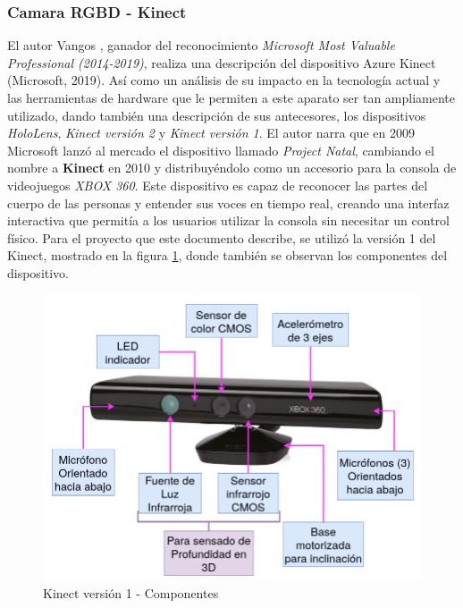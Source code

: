             \subsubsection{Camara RGBD - Kinect}

            El autor Vangos \cite{pterneas_mastering_2022}, ganador del reconocimiento \textit{Microsoft Most Valuable Professional (2014-2019)}, realiza una descripción del dispositivo Azure Kinect (Microsoft, 2019). Así como un análisis de su impacto en la tecnología actual y las herramientas de hardware que le permiten a este aparato ser tan ampliamente utilizado, dando también una descripción de sus antecesores, los dispositivos \textit{HoloLens}, \textit{Kinect versión 2} y \textit{Kinect versión 1}.
            El autor narra que en 2009 Microsoft lanzó al mercado el dispositivo llamado \textit{Project Natal}, cambiando el nombre a \textbf{Kinect} en 2010 y distribuyéndolo como un accesorio para la consola de videojuegos \textit{XBOX 360}. Este dispositivo es capaz de reconocer las partes del cuerpo de las personas y entender sus voces en tiempo real, creando una interfaz interactiva que permitía a los usuarios utilizar la consola sin necesitar un control físico. Para el proyecto que este documento describe, se utilizó la versión 1 del Kinect, mostrado en la figura \ref{fig:Kinect_Parts}, donde también se observan los componentes del dispositivo.

            \begin{figure}[ht]
                \centering
                \includegraphics[scale=0.25]{Figures/Kinect_parts.png}
                \caption{Kinect versión 1 - Componentes}
                \label{fig:Kinect_Parts}
            \end{figure}

